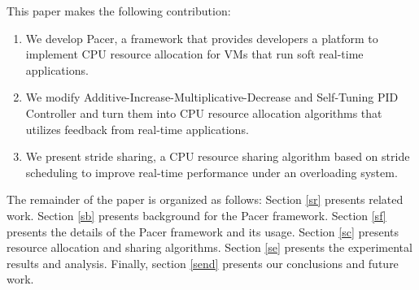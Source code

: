 This paper makes the following contribution:
\begin{enumerate}
\item We develop Pacer, a framework that provides developers a platform to implement CPU resource allocation for VMs that run soft real-time applications.
\item We modify Additive-Increase-Multiplicative-Decrease\cite{aimd} and Self-Tuning PID Controller\cite{apid} and turn them into CPU resource allocation algorithms that utilizes feedback from real-time applications.
\item We present stride sharing, a CPU resource sharing algorithm based on stride scheduling\cite{stride} to improve real-time performance under an overloading system.
\end{enumerate}

The remainder of the paper is organized as follows: Section \ref{sr} presents related work. Section \ref{sb} presents background for the Pacer framework. Section \ref{sf} presents the details of the Pacer framework and its usage. Section \ref{sc} presents resource allocation and sharing algorithms. Section \ref{se} presents the experimental results and analysis. Finally, section \ref{send} presents our conclusions and future work.


